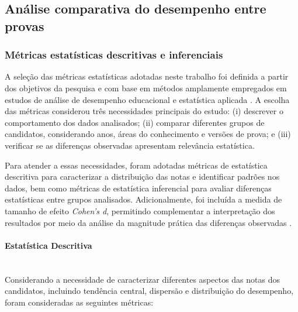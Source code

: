\documentclass[a4paper,10pt, twocolumn]{article}
\begin{document}
\subsection{Análise comparativa do desempenho entre provas}

\subsubsection{Métricas estatísticas descritivas e inferenciais}

\label{sec:metricas-descritivas-inferenciais}

A seleção das métricas estatísticas adotadas neste trabalho foi definida a partir dos objetivos da pesquisa e com base em métodos amplamente empregados em estudos de análise de desempenho educacional e estatística aplicada \cite{estatistica_descritiva_inferencial,field2018discovering,cohen1988statistical}. A escolha das métricas considerou três necessidades principais do estudo: (i) descrever o comportamento dos dados analisados; (ii) comparar diferentes grupos de candidatos, considerando anos, áreas do conhecimento e versões de prova; e (iii) verificar se as diferenças observadas apresentam relevância estatística.

Para atender a essas necessidades, foram adotadas métricas de estatística descritiva para caracterizar a distribuição das notas e identificar padrões nos dados, bem como métricas de estatística inferencial para avaliar diferenças estatísticas entre grupos analisados. Adicionalmente, foi incluída a medida de tamanho de efeito \textit{Cohen's d}, permitindo complementar a interpretação dos resultados por meio da análise da magnitude prática das diferenças observadas \cite{cohen1988statistical}.

\paragraph{Estatística Descritiva}
\mbox{}\\
Considerando a necessidade de caracterizar diferentes aspectos das notas dos candidatos, incluindo tendência central, dispersão e distribuição do desempenho, foram consideradas as seguintes métricas:
\end{document}
